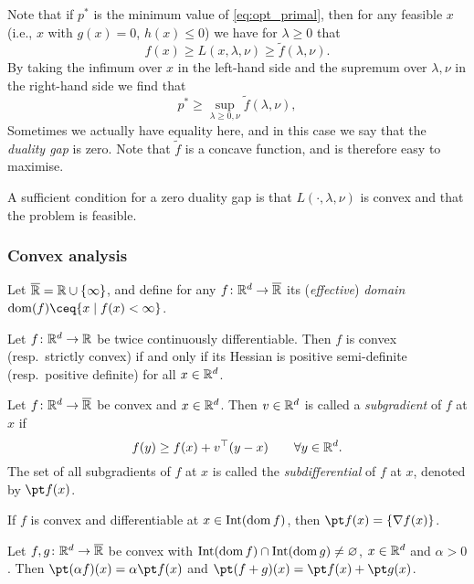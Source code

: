 Note that if $p^*$ is the minimum value of \eqref{eq:opt_primal}, then for any feasible $x$ (i.e., $x$ with $g(x) = 0$, $h(x) \leq 0$)
we have for $\lambda \geq 0$ that 
\[
f(x) \geq L(x, \lambda, \nu) \geq \tilde f(\lambda, \nu).
\]
By taking the infimum over $x$ in the left-hand side and the supremum over $\lambda, \nu$ in the right-hand side we find that
\[
p^*  \geq \sup_{\lambda \geq 0, \nu} \tilde f(\lambda, \nu),
\]
Sometimes we actually have equality here, and in this case we say that the \emph{duality gap} is zero. Note that $\tilde f$ is a concave function, and is therefore easy to maximise. 

A sufficient condition for a zero duality gap is that $L(\cdot, \lambda, \nu)$ is convex and that the problem is feasible. 

\subsubsection*{Convex analysis}

Let $\overline{\mathbb R} = \mathbb R \cup \qty{\infty}$, and define for any $f \colon \mathbb R^d \to \overline{\mathbb R}$ its (\emph{effective}) \emph{domain} $\dom(f) \ceq \qty{x \mid f(x) < \infty}$.
\begin{proposition}
	Let $f \colon \mathbb R^d \to \mathbb R$ be twice continuously differentiable. Then $f$ is convex (resp.\ strictly convex) if and only if its Hessian is positive semi-definite (resp.\ positive definite) for all $x \in \mathbb R^d$.
\end{proposition}

\begin{definition}
	Let $f \colon \mathbb R^d \to \overline{\mathbb R}$  be convex and $x \in \mathbb R^d$. Then $v \in \mathbb R^d$ is called a \emph{subgradient} of $f$ at $x$ if
	\[
	f(y) \geq f(x) + v^\top(y-x) \qquad\forall y \in \mathbb R^d. 
	\]
	The set of all subgradients of $f$ at $x$ is called the \emph{subdifferential} of $f$ at $x$, denoted by $\pt f(x)$. 
\end{definition}

\begin{proposition}
	If $f$ is convex and differentiable at $x \in \operatorname{Int}(\operatorname{dom} f)$, then $\pt f(x) = \qty{\nabla f(x)}$. 
\end{proposition}

\begin{proposition}
	Let $f, g \colon \mathbb R^d \to \overline{\mathbb R}$ be convex with $\operatorname{Int}(\operatorname{dom} f) \cap \operatorname{Int}(\operatorname{dom} g) \neq\varnothing$, $x \in \mathbb R^d$ and $\alpha > 0$. Then $\pt(\alpha f)(x) = \alpha \pt f(x)$ and $\pt(f+g)(x) = \pt f(x) + \pt g(x)$. 
\end{proposition}

